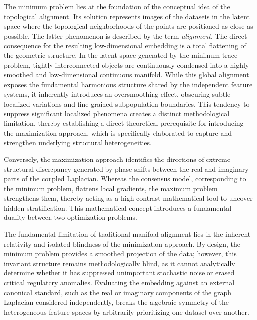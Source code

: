 \documentclass[a4paper,twoside,12pt]{article}
\begin{document}
 The minimum problem lies at the foundation of the conceptual idea of the topological alignment. Its solution represents images of the datasets in the latent space where the topological neighborhoods of the points are positioned  as close as possible. The latter phenomenon is described by the term {\it alignment}.
The direct consequence for the resulting low-dimensional embedding is a total
flattening of the geometric structure. In the latent space generated by the minimum
trace problem, tightly interconnected objects are continuously condensed  into a  highly smoothed and low-dimensional continuous manifold.
While this global alignment exposes the fundamental harmonious  structure shared by the
independent feature systems, it inherently introduces an oversmoothing effect,
obscuring subtle localized variations and fine-grained subpopulation boundaries. This tendency to suppress significant localized phenomena creates  a distinct methodological limitation, thereby establishing a direct theoretical prerequisite for introducing the maximization approach, which is specifically elaborated  to capture and strengthen underlying structural heterogeneities.

Conversely, the maximization approach identifies the directions of extreme structural discrepancy generated by phase shifts between the real and imaginary parts of the coupled Laplacian. Whereas the consensus model, corresponding to the minimum problem, flattens local gradients, the maximum problem strengthens them, thereby acting as a high-contrast mathematical tool to uncover hidden stratification.
 This mathematical concept introduces a fundamental duality between two optimization problems.











The fundamental limitation of traditional manifold alignment lies in the inherent
relativity and isolated blindness of the minimization approach. By design, the minimum problem
provides a smoothed projection of the data; however, this invariant structure remains
methodologically blind, as it cannot analytically determine whether it has suppressed
unimportant stochastic noise or erased critical regulatory anomalies. Evaluating
the embedding against an external canonical standard, such as the   real or imaginary
components of the graph  Laplacian considered  independently, breaks the algebraic symmetry of the
heterogeneous feature spaces by arbitrarily prioritizing one dataset over another.
\end{document}
